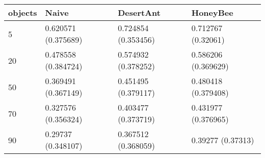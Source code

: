 \begin{tabular} {|l|l|l|l|}
\hline
objects & Naive & DesertAnt & HoneyBee \\
\hline
5 & 0.620571 (0.375689)  & 0.724854 (0.353456)  & 0.712767 (0.32061)  \\
20 & 0.478558 (0.384724)  & 0.574932 (0.378252)  & 0.586206 (0.369629)  \\
50 & 0.369491 (0.367149)  & 0.451495 (0.379117)  & 0.480418 (0.379408)  \\
70 & 0.327576 (0.356324)  & 0.403477 (0.373719)  & 0.431977 (0.376965)  \\
90 & 0.29737 (0.348107)  & 0.367512 (0.368059)  & 0.39277 (0.37313)  \\
\hline
\end{tabular}
